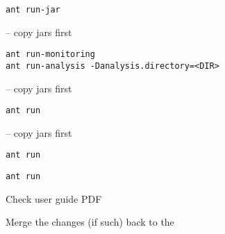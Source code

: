 \begin{compactenum}
\begin{compactenum}
\begin{compactitem}
\item {}
\setBashListing
\begin{lstlisting}
ant run-jar
\end{lstlisting}
\item {} -- copy jars first
\setBashListing
\begin{lstlisting}
ant run-monitoring
ant run-analysis -Danalysis.directory=<DIR>
\end{lstlisting}
\item {} -- copy jars first
\setBashListing
\begin{lstlisting}
ant run
\end{lstlisting}
\item {} -- copy jars first
\setBashListing
\begin{lstlisting}
ant run
\end{lstlisting}
\item {}
\setBashListing
\begin{lstlisting}
ant run
\end{lstlisting}
\end{compactitem}
\item Check user guide PDF 
\end{compactenum}

\item Merge the changes (if such) back to the 
\end{compactenum}
